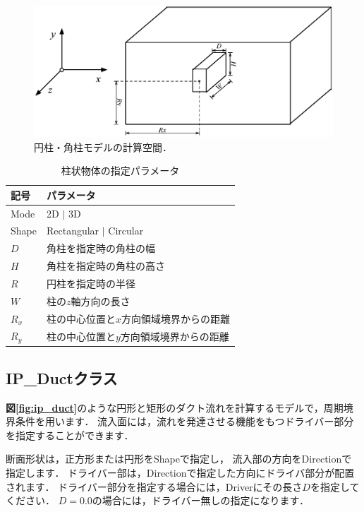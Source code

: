 \begin{figure}[htdp]
\begin{center}
\includegraphics[width=14cm,clip]{Cylinder.eps}
\end{center}
\caption{円柱・角柱モデルの計算空間．}
\label{fig:ip_cylinder}
\end{figure}

\begin{table}[htdp]
\small
\caption{柱状物体の指定パラメータ}
\begin{center}
\begin{tabular}{ll}\toprule
記号 & パラメータ\\ \midrule
Mode & 2D $|$ 3D\\ 
Shape & Rectangular $|$ Circular\\ \hline
$D$ & 角柱を指定時の角柱の幅\\
$H$ & 角柱を指定時の角柱の高さ\\
$R$ & 円柱を指定時の半径\\
$W$ & 柱の$z$軸方向の長さ\\
$R_x$ & 柱の中心位置と$x$方向領域境界からの距離\\
$R_y$ & 柱の中心位置と$y$方向領域境界からの距離\\
\bottomrule
\end{tabular}
\end{center}
\label{tbl:ip_cylinder}
\end{table}

%
\subsection{IP\_Ductクラス}
\textbf{図\ref{fig:ip_duct}}のような円形と矩形のダクト流れを計算するモデルで，周期境界条件を用います．
流入面には，流れを発達させる機能をもつドライバー部分を指定することができます．

断面形状は，正方形または円形をShapeで指定し，
流入部の方向をDirectionで指定します．
ドライバー部は，Directionで指定した方向にドライバ部分が配置されます．
ドライバー部分を指定する場合には，Driverにその長さ$D$を指定してください．
$D=0.0$の場合には，ドライバー無しの指定になります．

